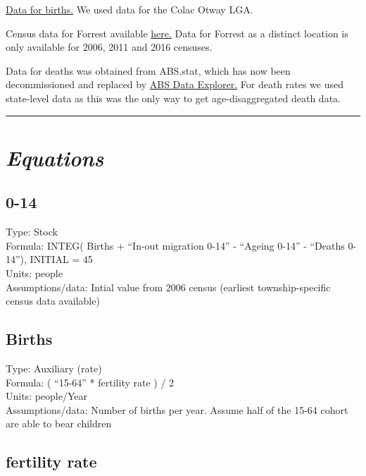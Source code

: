 \documentclass[
  11pt,
]{book}
\begin{document}
\href{https://www.abs.gov.au/AUSSTATS/abs@.nsf/DetailsPage/3301.02018?OpenDocument}{Data for births.} We used data for the Colac Otway LGA.

Census data for Forrest available \href{https://www.abs.gov.au/websitedbs/D3310114.nsf/Home/2016\%20QuickStats}{here.} Data for Forrest as a distinct location is only available for 2006, 2011 and 2016 censuses.

Data for deaths was obtained from ABS.stat, which has now been decommissioned and replaced by \href{https://explore.data.abs.gov.au/}{ABS Data Explorer.} For death rates we used state-level data as this was the only way to get age-disaggregated death data.

\begin{center}\rule{0.5\linewidth}{0.5pt}\end{center}

\hypertarget{equations}{%
\section{\texorpdfstring{\emph{Equations}}{Equations}}\label{equations}}

\hypertarget{section}{%
\subsection{0-14}\label{section}}

Type: Stock\\
Formula: INTEG( Births + ``In-out migration 0-14'' - ``Ageing 0-14'' - ``Deaths 0-14''), INITIAL = 45\\
Units: people\\
Assumptions/data: Intial value from 2006 census (earliest township-specific census data available)

\hypertarget{births}{%
\subsection{Births}\label{births}}

Type: Auxiliary (rate)\\
Formula: ( ``15-64'' * fertility rate ) / 2\\
Units: people/Year\\
Assumptions/data: Number of births per year. Assume half of the 15-64 cohort are able to bear children

\hypertarget{fertility-rate}{%
\subsection{fertility rate}\label{fertility-rate}}
\end{document}
